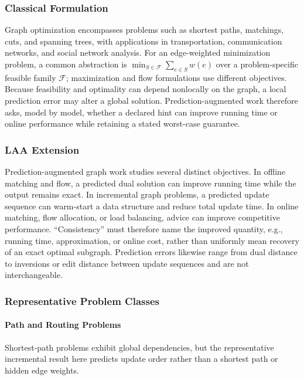 \documentclass[acmsmall,screen,nonacm]{acmart}
\theoremstyle{acmdefinition}%
\begin{document}
\subsubsection{Classical Formulation}
Graph optimization encompasses problems such as shortest paths, matchings, cuts, and spanning trees, with applications in transportation, communication networks, and social network analysis. For an edge-weighted minimization problem, a common abstraction is $\min_{S \in \mathcal{F}} \sum_{e \in S} w(e)$ over a problem-specific feasible family $\mathcal{F}$; maximization and flow formulations use different objectives. Because feasibility and optimality can depend nonlocally on the graph, a local prediction error may alter a global solution. Prediction-augmented work therefore asks, model by model, whether a declared hint can improve running time or online performance while retaining a stated worst-case guarantee.

\subsubsection{LAA Extension}
Prediction-augmented graph work studies several distinct objectives. In offline matching and flow, a predicted dual solution can improve running time while the output remains exact. In incremental graph problems, a predicted update sequence can warm-start a data structure and reduce total update time. In online matching, flow allocation, or load balancing, advice can improve competitive performance. ``Consistency'' must therefore name the improved quantity, e.g., running time, approximation, or online cost, rather than uniformly mean recovery of an exact optimal subgraph. Prediction errors likewise range from dual distance to inversions or edit distance between update sequences and are not interchangeable.

\subsubsection{Representative Problem Classes}

\paragraph{Path and Routing Problems}
Shortest-path problems exhibit global dependencies, but the representative incremental result here predicts update order rather than a shortest path or hidden edge weights.
\end{document}
